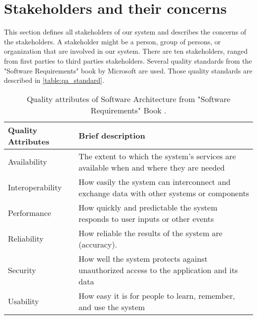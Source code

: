 \section{Stakeholders and their concerns}


This section defines all stakeholders of our system and describes the concerns of the stakeholders. A stakeholder might be a person, group of persons, or organization that are involved in our system. There are ten stakeholders, ranged from first parties to third parties stakeholders. Several quality standards from the "Software Requirements" book by Microsoft \cite{wiegers2013software} are used. Those quality standards are described in \autoref{table:qa_standard}.

\begin{table}[!htbp] \centering
	\caption{Quality attributes of Software Architecture from "Software Requirements" Book \cite{wiegers2013software}.}
	\label{table:qa_standard}
	\begin{tabular}{L{} L{}}
		\toprule
		\textbf{Quality Attributes} & \textbf{Brief description}                                                                                        \\ \midrule
		Availability                & The extent to which the system's services are available when and where they are needed                            \\
		Interoperability            & How easily the system can interconnect and exchange data with other systems or components                         \\
		Performance                 & How quickly and predictable the system responds to user inputs or other events                                    \\
		Reliability                 & How reliable the results of the system are (accuracy). \\
		Security                    & How well the system protects against unauthorized access to the application and its data                          \\
		Usability                   & How easy it is for people to learn, remember, and use the system                                                  \\
		\bottomrule
	\end{tabular}
\end{table}

